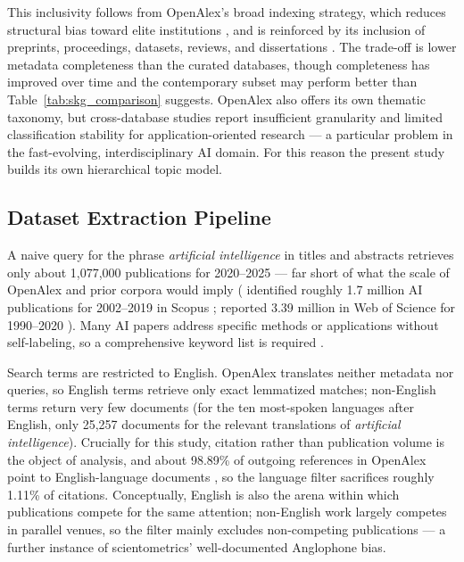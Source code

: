 \documentclass{article}
\let\cite\parencite
\begin{document}
	This inclusivity follows from OpenAlex's broad indexing strategy, which reduces structural bias toward elite institutions \cite{openalex2023}, and is reinforced by its inclusion of preprints, proceedings, datasets, reviews, and dissertations \cite{weimer2023quantification}. The trade-off is lower metadata completeness than the curated databases, though completeness has improved over time and the contemporary subset may perform better than Table~\ref{tab:skg_comparison} suggests. OpenAlex also offers its own thematic taxonomy, but cross-database studies report insufficient granularity \cite{stansfield2025analyzing} and limited classification stability \cite{haunschild2024use} for application-oriented research --- a particular problem in the fast-evolving, interdisciplinary AI domain. For this reason the present study builds its own hierarchical topic model.
	
	\subsection{Dataset Extraction Pipeline}
	\label{dataset_extraction_pipeline_chapter}
	
	A naive query for the phrase \textit{artificial intelligence} in titles and abstracts retrieves only about 1,077,000 publications for 2020--2025 --- far short of what the scale of OpenAlex and prior corpora would imply (\citeauthor{baruffaldi2020identifying} identified roughly 1.7 million AI publications for 2002--2019 in Scopus \cite{baruffaldi2020identifying}; \citeauthor{gargiulo2022cartography} reported 3.39 million in Web of Science for 1990--2020 \cite{gargiulo2022cartography}). Many AI papers address specific methods or applications without self-labeling, so a comprehensive keyword list is required \cite{baruffaldi2020identifying}.
	
	Search terms are restricted to English. OpenAlex translates neither metadata nor queries, so English terms retrieve only exact lemmatized matches; non-English terms return very few documents (for the ten most-spoken languages after English, only 25,257 documents for the relevant translations of \textit{artificial intelligence}). Crucially for this study, citation rather than publication volume is the object of analysis, and about 98.89\% of outgoing references in OpenAlex point to English-language documents \cite{pradier2025smack}, so the language filter sacrifices roughly 1.11\% of citations. Conceptually, English is also the arena within which publications compete for the same attention; non-English work largely competes in parallel venues, so the filter mainly excludes non-competing publications --- a further instance of scientometrics' well-documented Anglophone bias.
	
\end{document}
